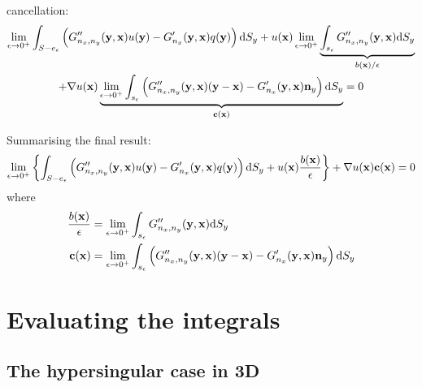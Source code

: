 \documentclass[a4paper,11pt]{article}
\newcommand{\td}{\mathrm{d}}
\begin{document}
%
cancellation:
%
\begin{multline}
\lim_{\epsilon \to 0^+}
\int_{S-e_{\epsilon}}
\left(
G''_{n_x,n_y}({\bf y}, {\bf x}) u({\bf y})
- G'_{n_x}({\bf y}, {\bf x}) q({\bf y})
\right)
\td S_y
+
u({\bf x})
\lim_{\epsilon \to 0^+}
\underbrace{
\int_{s_{\epsilon}}
G''_{n_x,n_y}({\bf y}, {\bf x}) 
\td S_y
}_{b({\bf x})/\epsilon}
\\
+
\nabla u({\bf x}) 
\underbrace{
\lim_{\epsilon \to 0^+}
\int_{s_{\epsilon}}
\left(
G''_{n_x,n_y}({\bf y}, {\bf x}) ({\bf y} - {\bf x})
- G'_{n_x}({\bf y}, {\bf x}) {\bf n}_y
\right)
\td S_y
}_{\bf c({\bf x})}
= 0
\end{multline}
%

Summarising the final result:
%
\begin{equation}
\lim_{\epsilon \to 0^+}
\left\{
\int_{S-e_{\epsilon}}
\left(
G''_{n_x,n_y}({\bf y}, {\bf x}) u({\bf y})
- G'_{n_x}({\bf y}, {\bf x}) q({\bf y})
\right)
\td S_y
+
u({\bf x})
\frac{b({\bf x})}{\epsilon}
\right\}
+
\nabla u({\bf x}) 
{\bf c}({\bf x})
= 0
\end{equation}
%
where
%
\begin{align}
\frac{b({\bf x})}{\epsilon}
&=
\lim_{\epsilon \to 0^+}
\int_{s_{\epsilon}}
G''_{n_x,n_y}({\bf y}, {\bf x}) 
\td S_y
\nonumber \\
\bf c({\bf x})
&=
\lim_{\epsilon \to 0^+}
\int_{s_{\epsilon}}
\left(
G''_{n_x,n_y}({\bf y}, {\bf x}) ({\bf y} - {\bf x})
- G'_{n_x}({\bf y}, {\bf x}) {\bf n}_y
\right)
\td S_y
\end{align}

\section{Evaluating the integrals}

\subsection{The hypersingular case in 3D}
\end{document}
